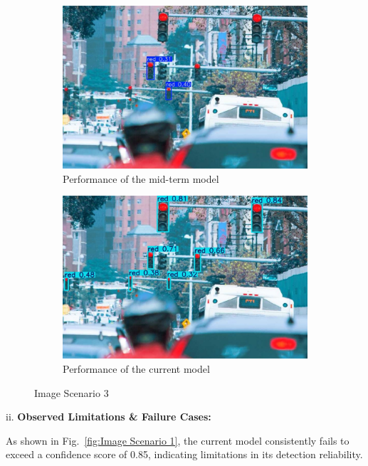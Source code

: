 \documentclass[journal,transmag]{IEEEtran}
\begin{document}
\begin{figure}[h]
    \centering
    \begin{subfigure}[b]{0.225\textwidth}
        \includegraphics[width=\textwidth]{Result_3.png}
        \caption{Performance of the mid-term model}
        \label{fig:Result_3}
    \end{subfigure}
    \hfill
    \begin{subfigure}[b]{0.225\textwidth}
        \includegraphics[width=\textwidth]{Result_3_new.jpg}
        \caption{Performance of the current model
}
        \label{fig:Result_3_new}
    \end{subfigure}
    \caption{Image Scenario 3}
    \label{fig:Image Scenario 3}
\end{figure}

ii. \textbf{Observed Limitations \& Failure Cases:}

As shown in Fig.~\ref{fig:Image Scenario 1}, the current model consistently fails to exceed a confidence score of 0.85, indicating limitations in its detection reliability.
\end{document}
